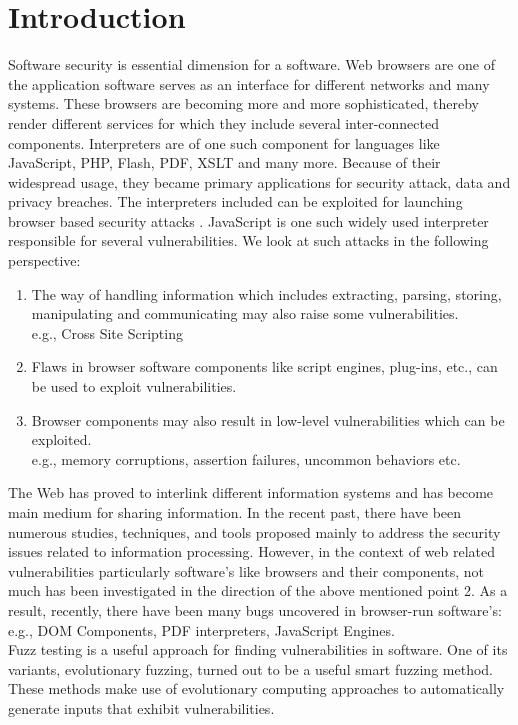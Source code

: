 \documentclass{acm_proc_article-sp}
\begin{document}
\section{Introduction}
Software security is essential dimension for a software. Web browsers are one of the application software serves as an interface for different networks and many systems. These browsers are becoming more and more sophisticated, thereby render different services for which they include several inter-connected components. Interpreters are of one such component for languages like JavaScript, PHP, Flash, PDF, XSLT and many more. Because of their widespread usage, they became primary applications for security attack, data and privacy breaches. The interpreters included can be exploited for launching browser based security attacks \cite{Sekar09}. JavaScript is one such widely used interpreter responsible for several vulnerabilities. We look at such attacks in the following perspective:
\begin{enumerate}
\item The way of handling information which includes extracting, parsing, storing, manipulating and communicating may also raise some vulnerabilities.
\\e.g., Cross Site Scripting
\item Flaws in browser software components like script engines, plug-ins, etc., can be used to exploit vulnerabilities. 
\item Browser components may also result in low-level vulnerabilities which can be exploited.
\\e.g., memory corruptions, assertion failures, uncommon behaviors etc.
\end{enumerate}
\indent The Web has proved to interlink different information systems and has become main medium for sharing information. In the recent past, there have been numerous studies, techniques, and tools proposed mainly to address the security issues related to information processing.	However, in the context of web related vulnerabilities particularly software's like browsers and their components, not much has been investigated in the direction of the above mentioned point 2. As a result, recently, there have been many bugs uncovered in browser-run software's: e.g., DOM Components, PDF interpreters, JavaScript Engines.\\
\indent Fuzz testing is a useful approach for finding vulnerabilities in software. One of its variants, evolutionary fuzzing, turned out to be a useful smart fuzzing method. These methods make use of evolutionary computing approaches to automatically generate inputs that exhibit vulnerabilities.\\
\end{document}
